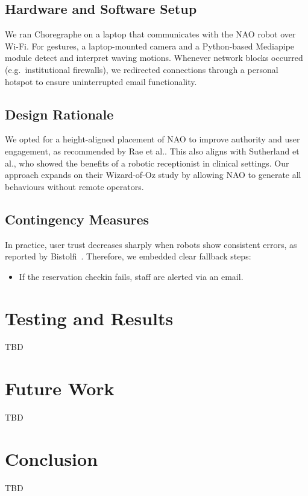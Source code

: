 \documentclass[conference]{IEEEtran}
\begin{document}
\subsection{Hardware and Software Setup} We ran Choregraphe on a laptop that communicates with the NAO robot over Wi-Fi.
For gestures, a laptop-mounted camera and a Python-based Mediapipe module detect and interpret waving motions.
Whenever network blocks occurred (e.g.\ institutional firewalls), we redirected connections through a personal hotspot to ensure uninterrupted email functionality.

\subsection{Design Rationale} We opted for a height-aligned placement of NAO to improve authority and user engagement,
as recommended by Rae et al.\cite{Rae2013}. This also aligns with Sutherland et al.\cite{Sutherland2019}, who showed the benefits of
a robotic receptionist in clinical settings. Our approach expands on their Wizard-of-Oz study by allowing NAO to generate all behaviours without remote operators.

\subsection{Contingency Measures} In practice, user trust decreases sharply when robots show consistent errors, as reported by Bistolfi~\cite{Bistolfi2022}.
Therefore, we embedded clear fallback steps:
\begin{itemize}
        \item If the reservation checkin fails, staff are alerted via an email.
\end{itemize}


\section{Testing and Results}

TBD

\section{Future Work}

TBD

\section{Conclusion}

TBD



\end{document}
